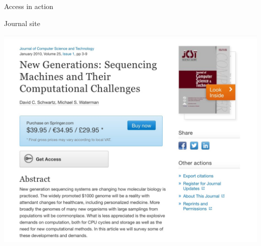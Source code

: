 \documentclass[12pt]{beamer}
\begin{document}
\begin{frame}[t]{Access in action}

{ \footnotesize \color{subtitle}
Journal site
}

\bigskip
\centerline{
\includegraphics[height=0.75\textheight]{Images/img03.jpg}
}
\end{frame}
\end{document}
